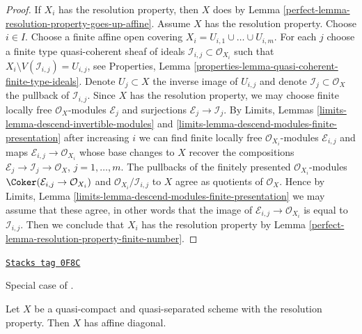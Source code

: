 \begin{proof}

If $X_i$ has the resolution property, then $X$ does by
Lemma \ref{perfect-lemma-resolution-property-goes-up-affine}.
Assume $X$ has the resolution property.
Choose $i \in I$. Choose a finite affine open covering
$X_i = U_{i, 1} \cup \ldots \cup U_{i, m}$.
For each $j$ choose a finite type quasi-coherent sheaf
of ideals $\mathcal{I}_{i, j} \subset \mathcal{O}_{X_i}$
such that $X_i \setminus V(\mathcal{I}_{i, j}) = U_{i, j}$, see
Properties, Lemma \ref{properties-lemma-quasi-coherent-finite-type-ideals}.
Denote $U_j \subset X$ the inverse image of $U_{i, j}$
and denote $\mathcal{I}_j \subset \mathcal{O}_X$
the pullback of $\mathcal{I}_{i, j}$.
Since $X$ has the resolution property, we may
choose finite locally free $\mathcal{O}_X$-modules $\mathcal{E}_j$
and surjections $\mathcal{E}_j \to \mathcal{I}_j$.
By Limits, Lemmas \ref{limits-lemma-descend-invertible-modules} and
\ref{limits-lemma-descend-modules-finite-presentation}
after increasing $i$ we can find finite locally free
$\mathcal{O}_{X_i}$-modules $\mathcal{E}_{i, j}$
and maps $\mathcal{E}_{i, j} \to \mathcal{O}_{X_i}$
whose base changes to $X$ recover the compositions
$\mathcal{E}_j \to \mathcal{I}_j \to \mathcal{O}_X$, $j = 1, \ldots, m$.
The pullbacks of the finitely presented $\mathcal{O}_{X_i}$-modules
$\Coker(\mathcal{E}_{i, j} \to \mathcal{O}_{X_i})$
and $\mathcal{O}_{X_i}/\mathcal{I}_{i, j}$
to $X$ agree as quotients of $\mathcal{O}_X$.
Hence by Limits, Lemma
\ref{limits-lemma-descend-modules-finite-presentation}
we may assume that these agree, in other words that
the image of $\mathcal{E}_{i, j} \to \mathcal{O}_{X_i}$
is equal to $\mathcal{I}_{i, j}$.
Then we conclude that $X_i$ has the resolution property
by Lemma \ref{perfect-lemma-resolution-property-finite-number}.
\end{proof}

\begin{lemma}
\label{perfect-lemma-resolution-property-affine-diagonal}
\href{https://stacks.math.columbia.edu/tag/0F8C}{\texttt{Stacks tag 0F8C}}

\begin{reference}
Special case of \cite[Proposition 1.3]{totaro_resolution}.
\end{reference}
Let $X$ be a quasi-compact and quasi-separated scheme with
the resolution property. Then $X$ has affine diagonal.
\end{lemma}

